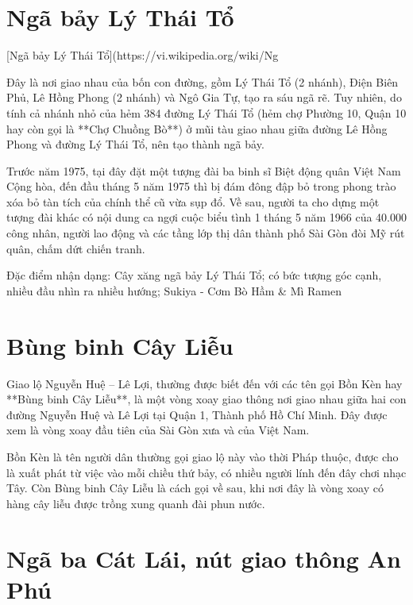\section{Ngã bảy Lý Thái Tổ}

[Ngã bảy Lý Thái Tổ](https://vi.wikipedia.org/wiki/Ng%

Đây là nơi giao nhau của bốn con đường, gồm Lý Thái Tổ (2 nhánh), Điện Biên Phủ, Lê Hồng Phong (2 nhánh) và Ngô Gia Tự, tạo ra sáu ngã rẽ. Tuy nhiên, do tính cả nhánh nhỏ của hẻm 384 đường Lý Thái Tổ (hẻm chợ Phường 10, Quận 10 hay còn gọi là **Chợ Chuồng Bò**) ở mũi tàu giao nhau giữa đường Lê Hồng Phong và đường Lý Thái Tổ, nên tạo thành ngã bảy.

Trước năm 1975, tại đây đặt một tượng đài ba binh sĩ Biệt động quân Việt Nam Cộng hòa, đến đầu tháng 5 năm 1975 thì bị đám đông đập bỏ trong phong trào xóa bỏ tàn tích của chính thể cũ vừa sụp đổ. Về sau, người ta cho dựng một tượng đài khác có nội dung ca ngợi cuộc biểu tình 1 tháng 5 năm 1966 của 40.000 công nhân, người lao động và các tầng lớp thị dân thành phố Sài Gòn đòi Mỹ rút quân, chấm dứt chiến tranh.

Đặc điểm nhận dạng: Cây xăng ngã bảy Lý Thái Tổ; có bức tượng góc cạnh, nhiều đầu nhìn ra nhiều hướng; Sukiya - Cơm Bò Hầm \& Mì Ramen

\section{Bùng binh Cây Liễu}

Giao lộ Nguyễn Huệ – Lê Lợi, thường được biết đến với các tên gọi Bồn Kèn hay **Bùng binh Cây Liễu**, là một vòng xoay giao thông nơi giao nhau giữa hai con đường Nguyễn Huệ và Lê Lợi tại Quận 1, Thành phố Hồ Chí Minh. Đây được xem là vòng xoay đầu tiên của Sài Gòn xưa và của Việt Nam.

Bồn Kèn là tên người dân thường gọi giao lộ này vào thời Pháp thuộc, được cho là xuất phát từ việc vào mỗi chiều thứ bảy, có nhiều người lính đến đây chơi nhạc Tây. Còn Bùng binh Cây Liễu là cách gọi về sau, khi nơi đây là vòng xoay có hàng cây liễu được trồng xung quanh đài phun nước.

\section{Ngã ba Cát Lái, nút giao thông An Phú}

